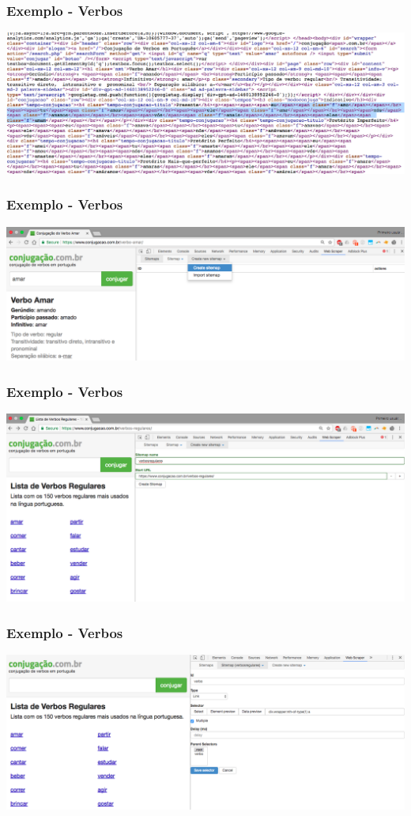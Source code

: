 \documentclass{beamer}
\begin{document}
\begin{frame}
\frametitle{Exemplo - Verbos}
\includegraphics[width=\textwidth]{Screen_Shot_2017-10-05_at_22_17_35.png}
\end{frame}

\begin{frame}
\frametitle{Exemplo - Verbos}
\includegraphics[width=\textwidth]{Screen_Shot_2017-10-05_at_22_22_43.png}
\end{frame}

\begin{frame}
\frametitle{Exemplo - Verbos}
\includegraphics[width=\textwidth]{Screen_Shot_2017-10-05_at_22_23_21.png}
\end{frame}

\begin{frame}
\frametitle{Exemplo - Verbos}
\includegraphics[width=\textwidth]{Screen_Shot_2017-10-05_at_22_47_52.png}
\end{frame}
\end{document}
